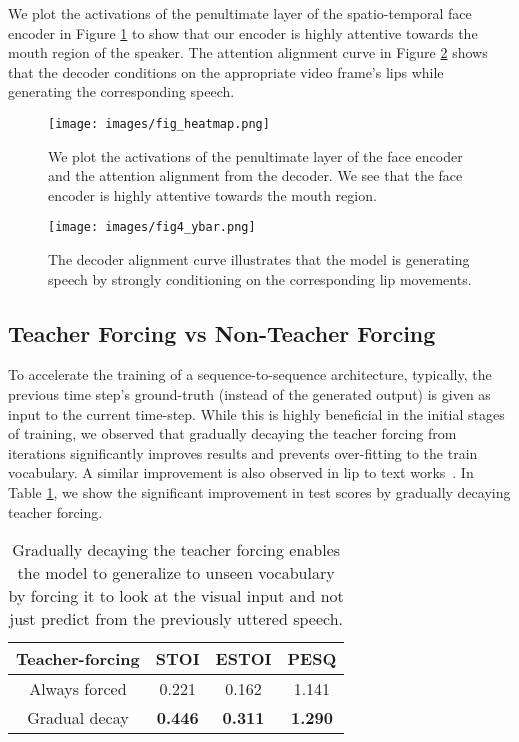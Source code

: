 \documentclass[10pt,twocolumn,letterpaper]{article}
\begin{document}
We plot the activations of the penultimate layer of the spatio-temporal face encoder in Figure \ref{fig:heatmap} to show that our encoder is highly attentive towards the mouth region of the speaker. The attention alignment curve in Figure \ref{fig:alignment} shows that the decoder conditions on the appropriate video frame's lips while generating the corresponding speech.

\begin{figure}[h]
  \texttt{[image: images/fig\_heatmap.png]}
  \caption{We plot the activations of the penultimate layer of the face encoder and the attention alignment from the decoder. We see that the face encoder is highly attentive towards the mouth region.}
  \label{fig:heatmap}
\end{figure}

\begin{figure}[h]
  \texttt{[image: images/fig4\_ybar.png]}
  \caption{The decoder alignment curve illustrates that the model is generating speech by strongly conditioning on the corresponding lip movements.}
  \label{fig:alignment}
\end{figure}

\subsection{Teacher Forcing vs Non-Teacher Forcing}
\label{subsection:teacherforcing}
To accelerate the training of a sequence-to-sequence architecture, typically, the previous time step's ground-truth (instead of the generated output) is given as input to the current time-step. While this is highly beneficial in the initial stages of training, we observed that gradually decaying the teacher forcing from  iterations significantly improves results and prevents over-fitting to the train vocabulary. A similar improvement is also observed in lip to text works~\cite{Afouras2018DeepLR}. In Table \ref{tab:teacherforcing}, we show the significant improvement in test scores by gradually decaying teacher forcing.

\begin{table}[h]
\centering
  \begin{tabular}{|c||c|c|c|}
    \hline
    Teacher-forcing & STOI & ESTOI & PESQ \\
    \hline
    Always forced & 0.221 & 0.162 & 1.141\\
    Gradual decay & \textbf{0.446} & \textbf{0.311} & \textbf{1.290} \\
  \hline
\end{tabular}
    \vspace{.2cm}
    \caption{Gradually decaying the teacher forcing enables the model to generalize to unseen vocabulary by forcing it to look at the visual input and not just predict from the previously uttered speech.}
    \label{tab:teacherforcing}
\end{table}
\end{document}
